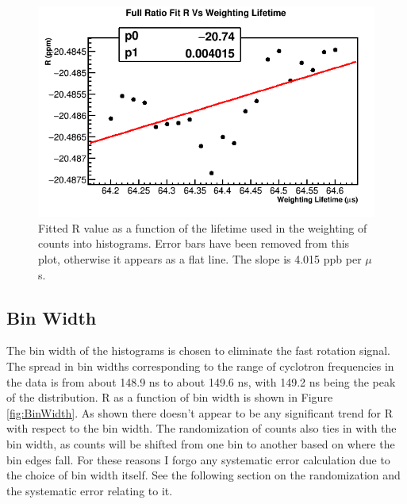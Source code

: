 		\begin{figure}[]
			\centering
			\includegraphics[width=.6\textwidth]{RatioCBO_R_Vs_weightingLifetime_Canv}
		    \caption[weightingLifetime]{Fitted R value as a function of the lifetime used in the weighting of counts into histograms. Error bars have been removed from this plot, otherwise it appears as a flat line. The slope is 4.015 ppb per $\mu$s.}
		    \label{fig:weightingLifetime}
		\end{figure}


\clearpage

	\subsection{Bin Width}

		The bin width of the histograms is chosen to eliminate the fast rotation signal. The spread in bin widths corresponding to the range of cyclotron frequencies in the data is from about 148.9 ns to about 149.6 ns, with 149.2 ns being the peak of the distribution. R as a function of bin width is shown in Figure \ref{fig:BinWidth}. As shown there doesn't appear to be any significant trend for R with respect to the bin width. The randomization of counts also ties in with the bin width, as counts will be shifted from one bin to another based on where the bin edges fall. For these reasons I forgo any systematic error calculation due to the choice of bin width itself. See the following section on the randomization and the systematic error relating to it.


